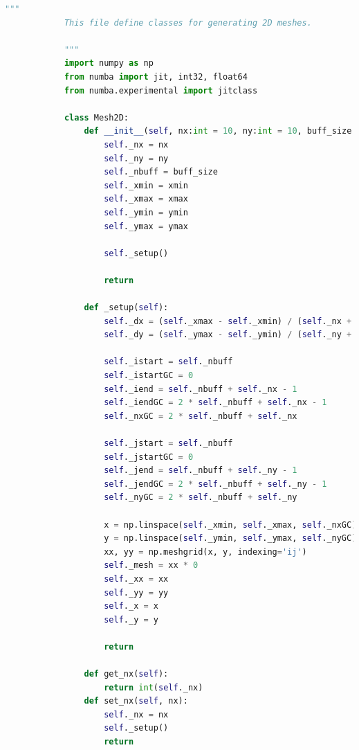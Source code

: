 \documentclass[12pt]{article}
\begin{document}
        \begin{lstlisting}[language={Python}]
            """
            This file define classes for generating 2D meshes.
            
            """
            import numpy as np
            from numba import jit, int32, float64
            from numba.experimental import jitclass
            
            class Mesh2D:
                def __init__(self, nx:int = 10, ny:int = 10, buff_size = 1, xmin = 0, xmax = 1, ymin = 0, ymax = 1):
                    self._nx = nx
                    self._ny = ny
                    self._nbuff = buff_size
                    self._xmin = xmin
                    self._xmax = xmax
                    self._ymin = ymin
                    self._ymax = ymax   
                    
                    self._setup()
                    
                    return
            
                def _setup(self):
                    self._dx = (self._xmax - self._xmin) / (self._nx + 1)
                    self._dy = (self._ymax - self._ymin) / (self._ny + 1)
                    
                    self._istart = self._nbuff
                    self._istartGC = 0
                    self._iend = self._nbuff + self._nx - 1
                    self._iendGC = 2 * self._nbuff + self._nx - 1
                    self._nxGC = 2 * self._nbuff + self._nx
                    
                    self._jstart = self._nbuff
                    self._jstartGC = 0
                    self._jend = self._nbuff + self._ny - 1
                    self._jendGC = 2 * self._nbuff + self._ny - 1
                    self._nyGC = 2 * self._nbuff + self._ny
                    
                    x = np.linspace(self._xmin, self._xmax, self._nxGC)
                    y = np.linspace(self._ymin, self._ymax, self._nyGC)
                    xx, yy = np.meshgrid(x, y, indexing='ij')
                    self._mesh = xx * 0
                    self._xx = xx
                    self._yy = yy
                    self._x = x
                    self._y = y
                    
                    return
                    
                def get_nx(self):
                    return int(self._nx)
                def set_nx(self, nx):
                    self._nx = nx
                    self._setup()
                    return
            

\end{lstlisting}
\end{document}
